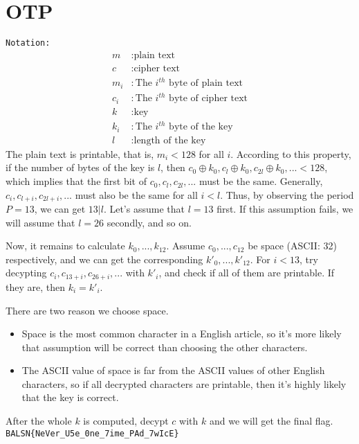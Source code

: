 \documentclass[12pt,a4paper]{article}
\newcommand{\xor}{\oplus}
\begin{document}
\section{OTP}
    \texttt{Notation: }
    \begin{align*}
        m&: \text{plain text}\\
        c&: \text{cipher text}\\
        m_i&: \text{The $i^{th}$ byte of plain text}\\
        c_i&: \text{The $i^{th}$ byte of cipher text}\\
        k&: \text{key}\\
        k_i&: \text{The $i^{th}$ byte of the key}\\
        l&: \text{length of the key}
    \end{align*}
    The plain text is printable, that is, $m_i<128$ for all $i$. According to this property, if the number of bytes of the key is $l$, then $c_0\xor k_0, c_l\xor k_0, c_{2l}\xor k_0, ... <128$, which implies that the first bit of $c_0, c_l, c_{2l}, ...$ must be the same. Generally, $c_i, c_{l+i}, c_{2l+i}, ...$ must also be the same for all $i<l$. Thus, by observing the period $P=13$, we can get $13|l$. Let's assume that $l=13$ first. If this assumption fails, we will assume that $l=26$ secondly, and so on.

    Now, it remains to calculate $k_0, ..., k_{12}$. Assume $c_0, ..., c_{12}$ be space (ASCII: 32) respectively, and we can get the corresponding $k'_0, ..., k'_{12}$. For $i<13$, try decypting $c_i, c_{13+i}, c_{26+i}, ...$ with $k'_i$, and check if all of them are printable. If they are, then $k_i=k'_i$.

    There are two reason we choose space.
    \begin{itemize}
    \item Space is the most common character in a English article, so it's more likely that assumption will be correct than choosing the other characters.
    \item The ASCII value of space is far from the ASCII values of other English characters, so if all decrypted characters are printable, then it's highly likely that the key is correct.
    \end{itemize}

    After the whole $k$ is computed, decypt $c$ with $k$ and we will get the final flag.\\
\texttt{BALSN\{NeVer\_U5e\_0ne\_7ime\_PAd\_7wIcE\}}
\end{document}
